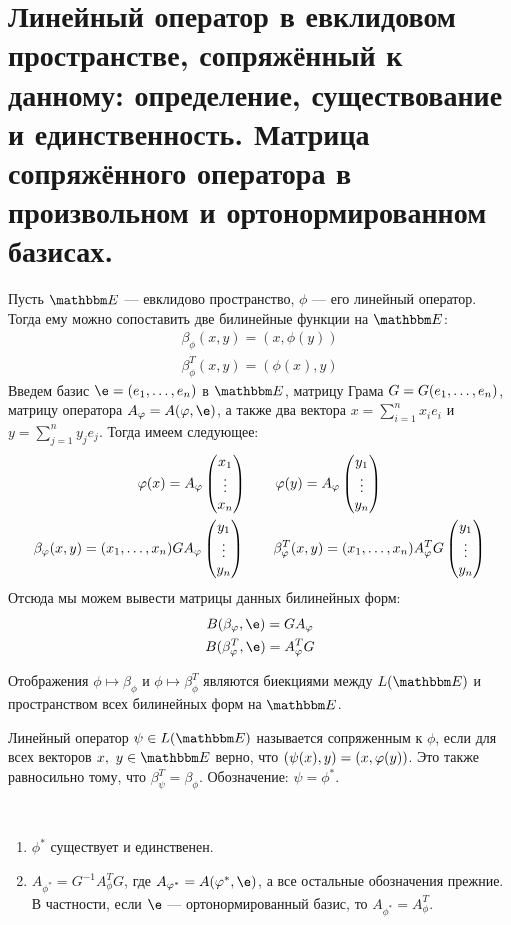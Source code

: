 \section{Линейный оператор в евклидовом пространстве, сопряжённый к данному: определение, существование и единственность. Матрица сопряжённого оператора в произвольном и ортонормированном базисах.}

Пусть $\E$ --- евклидово пространство, $\phi$ --- его линейный оператор. Тогда ему можно сопоставить две билинейные функции на $\E$:
\begin{gather*}
\beta_\phi(x, y) = (x, \phi(y)) \\
\beta^T_\phi(x, y) = (\phi(x), y)
\end{gather*}
Введем базис $\e = \vector{e}$ в $\E$, матрицу Грама $G = G({e}_1, \ldots, {e}_n)$, матрицу оператора $A_\phi \hm= A(\phi, \e)$, а также два вектора $x = \sum_{i = 1}^{n}x_ie_i$ и $y = \sum_{j = 1}^{n}y_je_j$. Тогда имеем следующее:
\begin{gather*}
\varphi(x) = A_\varphi\begin{pmatrix}{x}_1 \\\vdots\\{x}_n\end{pmatrix} \qquad \varphi(y) = A_\varphi \begin{pmatrix}{y}_1 \\\vdots\\{y}_n\end{pmatrix} \\ 
\beta_\varphi(x, y) = ({x}_1, \ldots, {x}_n) GA_\varphi \begin{pmatrix}{y}_1 \\\vdots\\{y}_n\end{pmatrix} \qquad
\beta^T_\varphi(x, y) = ({x}_1, \ldots, {x}_n)A_\varphi^TG\begin{pmatrix}{y}_1 \\\vdots\\{y}_n\end{pmatrix}
\end{gather*}
Отсюда мы можем вывести матрицы данных билинейных форм:
\begin{gather*}
B(\beta_\phi, \e) = GA_\phi \\
B(\beta^T_\phi, \e) = A^T_\phi G
\end{gather*}

\begin{Comment}
Отображения $\phi \mapsto \beta_\phi$ и $\phi \mapsto \beta^T_\phi$ являются биекциями между $L(\E)$ и пространством всех билинейных форм на $\E$.
\end{Comment}

\begin{Def}
Линейный оператор $\psi \in L(\E)$ называется сопряженным к $\phi$, если для всех векторов $x,\ y \in \E$ верно, что $(\psi(x), y)\hm = (x, \phi(y))$. Это также равносильно тому, что $\beta_\psi^T = \beta_\phi$. Обозначение: $\psi = \phi^*$.
\end{Def}

\begin{Suggestion}\ 
\begin{enumerate}
\item $\phi^*$ существует и единственен.
\item $A_{\phi^*} = G^{-1}A_\phi^TG$, где $A_{\phi^*} = A(\phi^*, \e)$, а все остальные обозначения прежние. В частности, если $\e$ --- ортонормированный базис, то $A_{\phi^*} = A_{\phi}^T$.
\end{enumerate}
\end{Suggestion}

